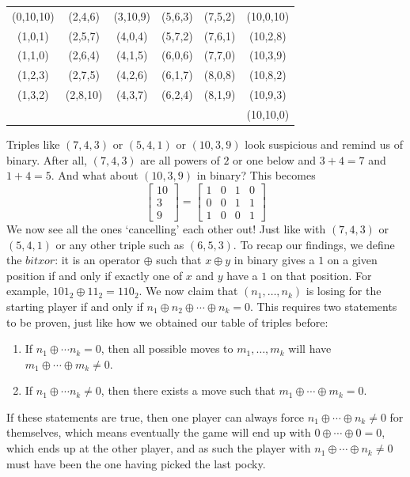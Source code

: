 \documentclass[11pt]{scrartcl}
\begin{document}
\begin{enumerate}[label=\textbf{C\arabic*}.]
\begin{enumerate}
\begin{table}[]
\begin{tabular}{cccccc}
(0,10,10) & (2,4,6)  & (3,10,9) & (5,6,3) & (7,5,2) & (10,0,10) \\
(1,0,1)   & (2,5,7)  & (4,0,4)  & (5,7,2) & (7,6,1) & (10,2,8)  \\
(1,1,0)   & (2,6,4)  & (4,1,5)  & (6,0,6) & (7,7,0) & (10,3,9)  \\
(1,2,3)   & (2,7,5)  & (4,2,6)  & (6,1,7) & (8,0,8) & (10,8,2)  \\
(1,3,2)   & (2,8,10) & (4,3,7)  & (6,2,4) & (8,1,9) & (10,9,3)  \\
          &          &          &         &         & (10,10,0)
\end{tabular}
\end{table}

\pagebreak

    Triples like $(7, 4, 3)$ or $(5, 4, 1)$ or $(10, 3, 9)$ look suspicious and remind us of binary. After all, $(7, 4, 3)$ are all powers of $2$ or one below and $3 + 4 = 7$ and $1 + 4 = 5$. And what about $(10, 3, 9)$ in binary? This becomes
    \[
        \begin{bmatrix} 10 \\ 3 \\ 9 \end{bmatrix} = 
        \begin{bmatrix} 1 & 0 & 1 & 0 \\ 0 & 0 & 1 & 1 \\ 1 & 0 & 0 & 1 \end{bmatrix}
    \]
    We now see all the ones `cancelling' each other out! Just like with $(7,4,3)$ or $(5,4,1)$ or any other triple such as $(6, 5, 3)$. To recap our findings, we define the $\textit{bitxor}$: it is an operator $\oplus$ such that $x \oplus y$ in binary gives a $1$ on a given position if and only if exactly one of $x$ and $y$ have a $1$ on that position. For example, $101_2 \oplus 11_2 = 110_2$. We now claim that $(n_1, \ldots, n_k)$ is losing for the starting player if and only if $n_1 \oplus n_2 \oplus \cdots \oplus n_k = 0$. This requires two statements to be proven, just like how we obtained our table of triples before:
    \begin{enumerate}
        \item If $n_1 \oplus \cdots n_k = 0$, then all possible moves to $m_1, \ldots, m_k$ will have $m_1 \oplus \cdots \oplus m_k \ne 0$.
        \item If $n_1 \oplus \cdots n_k \ne 0$, then there exists a move such that $m_1 \oplus \cdots \oplus m_k = 0$.
    \end{enumerate}
    If these statements are true, then one player can always force $n_1 \oplus \cdots \oplus n_k \ne 0$ for themselves, which means eventually the game will end up with $0 \oplus \cdots \oplus 0 = 0$, which ends up at the other player, and as such the player with $n_1 \oplus \cdots \oplus n_k \ne 0$ must have been the one having picked the last pocky.
    

\end{enumerate}
\end{enumerate}
\end{document}

